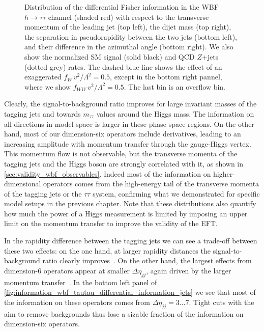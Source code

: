 \begin{figure}
  \caption{Distribution of the differential Fisher information in the
    WBF $h \to \tau \tau$ channel (shaded red) with respect to the
    transverse momentum of the leading jet (top left), the dijet mass
    (top right), the separation in pseudorapidity between the two jets
    (bottom left), and their difference in the azimuthal angle (bottom
    right). We also show the normalized SM signal (solid black) and
    QCD $Z$+jets (dotted grey) rates. The dashed blue line shows the
    effect of an exaggerated $f_{W} \, v^2 / \Lambda^2 = 0.5$, except
    in the bottom right pannel, where we show
    $f_{WW} \, v^2 / \Lambda^2 = 0.5$. The last bin is an overflow
    bin.}
  \label{fig:information_wbf_tautau_differential_information_jets}
\end{figure}

Clearly, the signal-to-background ratio improves for large invariant
masses of the tagging jets and towards $m_{\tau \tau}$ values around
the Higgs mass. The information on all directions in model space is
larger in these phase-space regions. On the other hand, most of our
dimension-six operators include derivatives, leading to an increasing
amplitude with momentum transfer through the gauge-Higgs vertex. This
momentum flow is not observable, but the transverse momenta of the
tagging jets and the Higgs boson are strongly correlated with it, as
shown in \autoref{sec:validity_wbf_observables}. Indeed most of the
information on higher-dimensional operators comes from the high-energy
tail of the transverse momenta of the tagging jets or the $\tau \tau$
system, confirming what we demonstrated for specific model setups in
the previous chapter. Note that these distributions also quantify how
much the power of a Higgs measurement is limited by imposing an upper
limit on the momentum transfer to improve the validity of the EFT.

In the rapidity difference between the tagging jets we can see a
trade-off between these two effects: on the one hand, at larger
rapidity distances the signal-to-background ratio clearly
improves~\cite{Kleiss:1987cj, Baur:1990xe, Barger:1991ib,
  Rainwater:1996ud, Rainwater:1998kj, Cox:2010ug, Gerwick:2011tm}. On
the other hand, the largest effects from dimension-6 operators appear
at smaller $\Delta \eta_{jj}$, again driven by the larger momentum
transfer~\cite{Biekotter:2016ecg}. In the bottom left panel of
\autoref{fig:information_wbf_tautau_differential_information_jets} we
see that most of the information on these operators comes from
$\Delta \eta_{jj} = 3\dots7$. Tight cuts with the aim to remove
backgrounds thus lose a sizable fraction of the information on
dimension-six operators.

